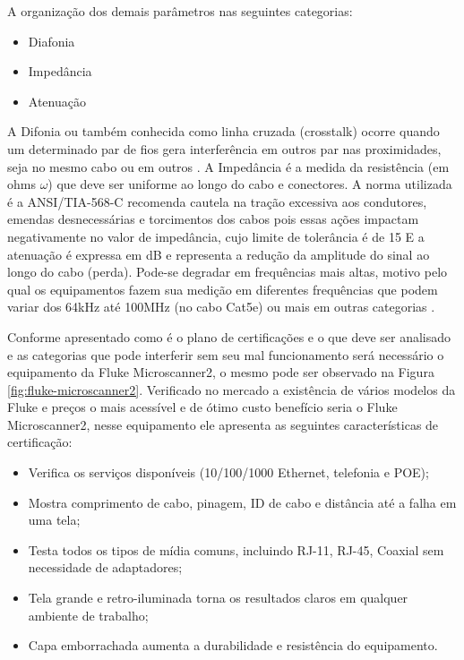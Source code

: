 \documentclass[	DIV=calc,%
							paper=a4,%
							fontsize=12pt,%
							onecolumn]{scrartcl}	 					%
\begin{document}
A organização dos demais parâmetros nas seguintes categorias:
\begin{itemize}
\item Diafonia
\item Impedância
\item Atenuação
\end{itemize}

A Difonia ou também conhecida como linha cruzada (crosstalk) ocorre quando um determinado par de fios gera interferência em outros par nas proximidades, seja no mesmo cabo ou em outros \cite{Samuel}.
A Impedância é a medida da resistência (em ohms $\omega$) que deve ser uniforme ao longo do cabo e conectores. A norma utilizada é a ANSI/TIA-568-C recomenda cautela na tração excessiva aos condutores, emendas desnecessárias e torcimentos dos cabos pois essas ações impactam negativamente no valor de impedância, cujo limite de tolerância é de 15%
E a atenuação é expressa em dB e representa a redução da amplitude do sinal ao longo do cabo (perda). Pode-se degradar em frequências mais altas, motivo pelo qual os equipamentos fazem sua medição em diferentes frequências que podem variar dos 64kHz até 100MHz (no cabo Cat5e) ou mais em outras categorias \cite{Samuel}.

Conforme apresentado como é o plano de certificações e o que deve ser analisado e as categorias que pode interferir sem seu mal funcionamento será necessário o equipamento da Fluke Microscanner2, o mesmo pode ser observado na Figura \ref{fig:fluke-microscanner2}. Verificado no mercado a existência de vários modelos da Fluke e preços o mais acessível e de ótimo custo benefício seria o Fluke Microscanner2, nesse equipamento ele apresenta as seguintes características de certificação:
\begin{itemize}
	\item Verifica os serviços disponíveis (10/100/1000 Ethernet, telefonia e POE);
	\item Mostra comprimento de cabo, pinagem, ID de cabo e distância até a falha em uma tela;
	\item Testa todos os tipos de mídia comuns, incluindo RJ-11, RJ-45, Coaxial sem necessidade de adaptadores;
	\item Tela grande e retro-iluminada torna os resultados claros em qualquer ambiente de trabalho;
	\item Capa emborrachada aumenta a durabilidade e resistência do equipamento.
\end{itemize}
\end{document}
